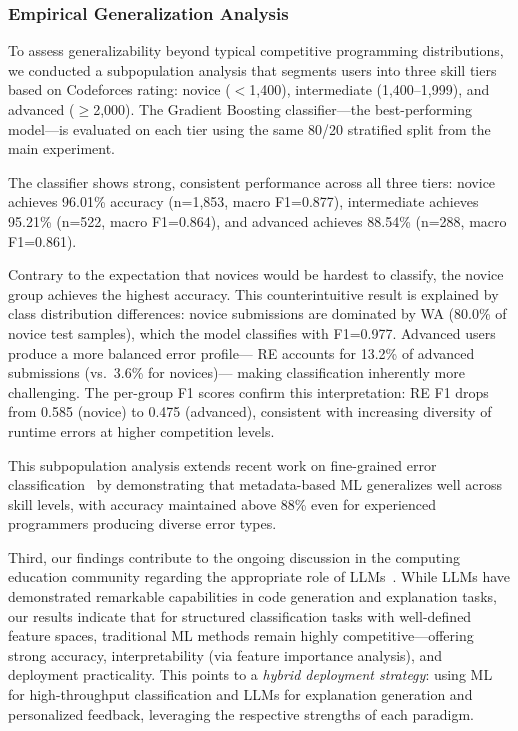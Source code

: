 \documentclass[acmsmall]{acmart}
\begin{document}
\subsubsection*{Empirical Generalization Analysis}
To assess generalizability beyond typical competitive programming
distributions, we conducted a subpopulation analysis that segments users into
three skill tiers based on Codeforces rating: novice ($<$1,400), intermediate
(1,400--1,999), and advanced ($\geq$2,000). The Gradient Boosting
classifier---the best-performing model---is evaluated on each tier using the
same 80/20 stratified split from the main experiment.

The classifier shows strong, consistent performance across all three tiers:
novice achieves 96.01\% accuracy (n=1,853, macro F1=0.877), intermediate
achieves 95.21\% (n=522, macro F1=0.864), and advanced achieves 88.54\%
(n=288, macro F1=0.861).

Contrary to the expectation that novices would be hardest to classify,
the novice group achieves the highest accuracy. This counterintuitive result
is explained by class distribution differences: novice submissions are
dominated by WA (80.0\% of novice test samples), which the model classifies
with F1=0.977. Advanced users produce a more balanced error profile---
RE accounts for 13.2\% of advanced submissions (vs.\ 3.6\% for novices)---
making classification inherently more challenging. The per-group F1 scores
confirm this interpretation: RE F1 drops from 0.585 (novice) to 0.475
(advanced), consistent with increasing diversity of runtime errors at higher
competition levels.

This subpopulation analysis extends recent work on fine-grained error
classification~\cite{altadmri2015most} by demonstrating that
metadata-based ML generalizes well across skill levels, with accuracy
maintained above 88\% even for experienced programmers producing diverse
error types.

Third, our findings contribute to the ongoing discussion in the computing
education community regarding the appropriate role of
LLMs~\cite{finnie2022robots,kazemitabaar2024impact}. While LLMs have
demonstrated remarkable capabilities in code generation and explanation tasks,
our results indicate that for structured classification tasks with
well-defined feature spaces, traditional ML methods remain highly
competitive---offering strong accuracy, interpretability (via feature
importance analysis), and deployment practicality. This points to a
\textit{hybrid deployment strategy}: using ML for high-throughput
classification and LLMs for explanation generation and personalized
feedback, leveraging the respective strengths of each paradigm.
\end{document}
